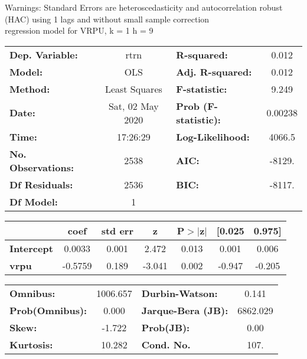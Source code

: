 Warnings: \newline
 [1] Standard Errors are heteroscedasticity and autocorrelation robust (HAC) using 1 lags and without small sample correction\\ 

regression model for VRPU, k = 1 h = 9\begin{center}
\begin{tabular}{lclc}
\toprule
\textbf{Dep. Variable:}    &       rtrn       & \textbf{  R-squared:         } &     0.012   \\
\textbf{Model:}            &       OLS        & \textbf{  Adj. R-squared:    } &     0.012   \\
\textbf{Method:}           &  Least Squares   & \textbf{  F-statistic:       } &     9.249   \\
\textbf{Date:}             & Sat, 02 May 2020 & \textbf{  Prob (F-statistic):} &  0.00238    \\
\textbf{Time:}             &     17:26:29     & \textbf{  Log-Likelihood:    } &    4066.5   \\
\textbf{No. Observations:} &        2538      & \textbf{  AIC:               } &    -8129.   \\
\textbf{Df Residuals:}     &        2536      & \textbf{  BIC:               } &    -8117.   \\
\textbf{Df Model:}         &           1      & \textbf{                     } &             \\
\bottomrule
\end{tabular}
\begin{tabular}{lcccccc}
                   & \textbf{coef} & \textbf{std err} & \textbf{z} & \textbf{P$> |$z$|$} & \textbf{[0.025} & \textbf{0.975]}  \\
\midrule
\textbf{Intercept} &       0.0033  &        0.001     &     2.472  &         0.013        &        0.001    &        0.006     \\
\textbf{vrpu}      &      -0.5759  &        0.189     &    -3.041  &         0.002        &       -0.947    &       -0.205     \\
\bottomrule
\end{tabular}
\begin{tabular}{lclc}
\textbf{Omnibus:}       & 1006.657 & \textbf{  Durbin-Watson:     } &    0.141  \\
\textbf{Prob(Omnibus):} &   0.000  & \textbf{  Jarque-Bera (JB):  } & 6862.029  \\
\textbf{Skew:}          &  -1.722  & \textbf{  Prob(JB):          } &     0.00  \\
\textbf{Kurtosis:}      &  10.282  & \textbf{  Cond. No.          } &     107.  \\
\bottomrule
\end{tabular}
\end{center}

